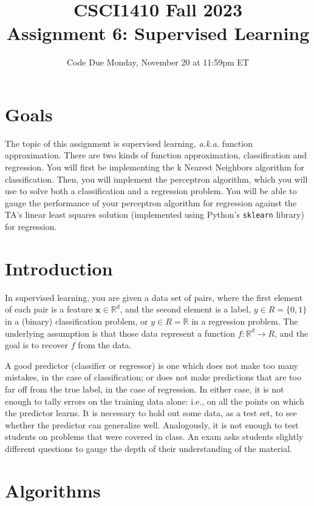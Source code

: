 \documentclass{article}
\title{CSCI1410 Fall 2023 \\
Assignment 6: Supervised Learning}
\date{Code Due Monday, November 20 at 11:59pm ET}
\begin{document}
\maketitle


\section{Goals}

The topic of this assignment is supervised learning, \emph{a.k.a.\/} function approximation.
There are two kinds of function approximation, classification and regression. You will first be implementing the k Nearest Neighbors algorithm for classification. Then, you will implement the perceptron algorithm, which you will use to solve both a classification and a regression problem.  You will be able to gauge the performance of your perceptron algorithm for regression against the TA's  linear least squares solution (implemented using Python's \texttt{sklearn} library) for regression.

\section{Introduction}

In supervised learning, you are given a data set of pairs,
where the first element of each pair is a feature $\bm{x} \in \mathbb{R}^{d}$,
and the second element is a label, $y \in R = \{ 0,1 \}$ in a (binary) classification problem,
or $y \in R = \mathbb{R}$ in a regression problem.
The underlying assumption is that those data represent a function $f: \mathbb{R}^{d} \to R$,
and the goal is to recover $f$ from the data.

A good predictor (classifier or regressor) is one which does not make too many mistakes, in the case of classification;
or does not make predictions that are too far off from the true label, in the case of regression.
In either case, it is not enough to tally errors on the training data alone: i.e., on all the points on which the predictor learns.
It is necessary to hold out some data, as a test set, to see whether the predictor can generalize well.
Analogously, it is not enough to test students on problems that were covered in class.
An exam asks students slightly different questions to gauge the depth of their understanding of the material.


\section{Algorithms}
\end{document}
